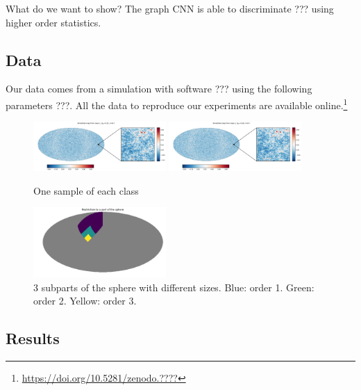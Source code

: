 \documentclass[preprint,12pt,authoryear]{elsarticle}
\newcommand{\todo}[1]{{\color[rgb]{.6,.1,.6}{#1}}}
\newcommand{\assign}[1]{{\color[rgb]{.8,.5,.8}{Assigned: #1 }}}
\newcommand{\1}{\b{1}}              %
\newcommand{\0}{\b{0}}              %
\begin{document}
What do we want to show? The graph CNN is able to discriminate ??? using higher order statistics.

\subsection{Data}
\assign{Tomek}

Our data comes from a simulation with software ??? using the following parameters ???. All the data to reproduce our experiments are available online.\footnote{\url{https://doi.org/10.5281/zenodo.????} \todo{correct DOI}}

\begin{figure}[!ht]
\centering
\includegraphics[width=0.45\textwidth]{figures/smooth_map_class_1.pdf}
\includegraphics[width=0.45\textwidth]{figures/smooth_map_class_2.pdf}
\caption{One sample of each class }
\label{fig:map_sample}
\end{figure}

\begin{figure}[!ht]
\centering
\includegraphics[width=0.45\textwidth]{figures/part_sphere.pdf}
\caption{3 subparts of the sphere with different sizes. Blue: order 1. Green: order 2. Yellow: order 3.}
\label{fig:subpart_sphere}
\end{figure}

\subsection{Results}
\end{document}
